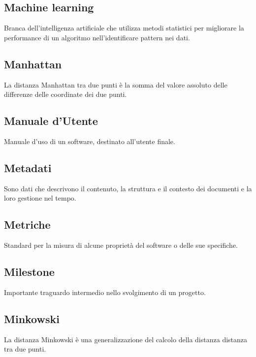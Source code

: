 \documentclass[../glossario.tex]{subfiles}
\begin{document}
\subsection*{Machine learning}
{}
Branca dell'intelligenza artificiale che utilizza metodi statistici per migliorare la performance di un algoritmo nell'identificare pattern nei dati.


\subsection*{Manhattan}
{}
La distanza Manhattan tra due punti è la somma del valore assoluto delle differenze delle coordinate dei due punti.

\subsection*{Manuale d'Utente}
{}
Manuale d'uso di un software, destinato all'utente finale.

\subsection*{Metadati}
{}
Sono dati che descrivono il contenuto, la struttura e il contesto dei documenti e la loro gestione nel tempo.


\subsection*{Metriche}
{}
Standard per la misura di alcune proprietà del software o delle sue specifiche.

\subsection*{Milestone}
{}
Importante traguardo intermedio nello svolgimento di un progetto.

\subsection*{Minkowski}
{}
La distanza Minkowski è una generalizzazione del calcolo della distanza distanza tra due punti.
\end{document}
